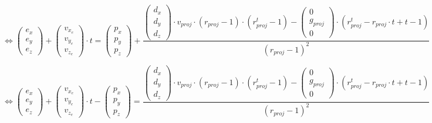 \begin{equation*}
    \Leftrightarrow {\begin{pmatrix} e_x \\ e_y \\ e_z \end{pmatrix}} + {\begin{pmatrix} v_{x_e} \\ v_{y_e} \\ v_{z_e} \end{pmatrix}} \cdot t = {\begin{pmatrix} p_x \\ p_y \\ p_z \end{pmatrix}} + \frac{{\begin{pmatrix} d_x \\ d_y \\ d_z \end{pmatrix}} \cdot v_{proj} \cdot (r_{proj} - 1) \cdot (r_{proj}^t - 1) - {\begin{pmatrix} 0 \\ g_{proj} \\ 0 \end{pmatrix}} \cdot (r_{proj}^t - r_{proj} \cdot t + t - 1)}{(r_{proj} - 1)^2}
\end{equation*}

\begin{equation*}
    \Leftrightarrow {\begin{pmatrix} e_x \\ e_y \\ e_z \end{pmatrix}} + {\begin{pmatrix} v_{x_e} \\ v_{y_e} \\ v_{z_e} \end{pmatrix}} \cdot t - {\begin{pmatrix} p_x \\ p_y \\ p_z \end{pmatrix}} = \frac{{\begin{pmatrix} d_x \\ d_y \\ d_z \end{pmatrix}} \cdot v_{proj} \cdot (r_{proj} - 1) \cdot (r_{proj}^t - 1) - {\begin{pmatrix} 0 \\ g_{proj} \\ 0 \end{pmatrix}} \cdot (r_{proj}^t - r_{proj} \cdot t + t - 1)}{(r_{proj} - 1)^2}
\end{equation*}

